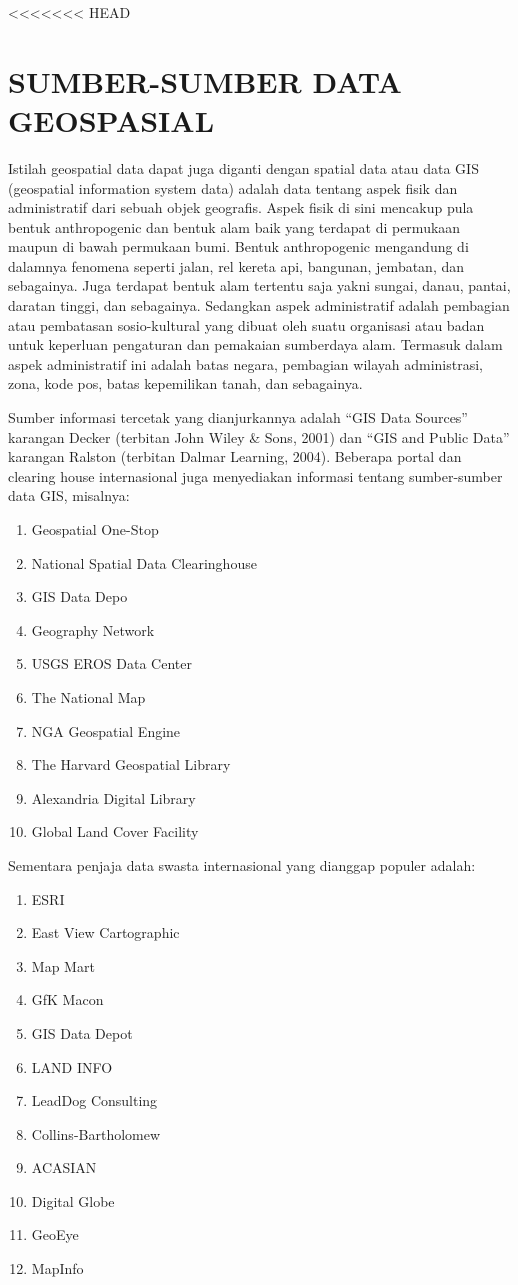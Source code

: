 <<<<<<< HEAD
\section{SUMBER-SUMBER DATA GEOSPASIAL}

Istilah geospatial data dapat juga diganti dengan spatial data atau data GIS (geospatial information system data) adalah data tentang aspek fisik dan administratif dari sebuah objek geografis. Aspek fisik di sini mencakup pula bentuk anthropogenic dan bentuk alam baik yang terdapat di permukaan maupun di bawah permukaan bumi. Bentuk anthropogenic mengandung di dalamnya fenomena seperti jalan, rel kereta api, bangunan, jembatan, dan sebagainya. Juga terdapat bentuk alam tertentu saja yakni sungai, danau, pantai, daratan tinggi, dan sebagainya. Sedangkan aspek administratif adalah pembagian atau pembatasan sosio-kultural yang dibuat oleh suatu organisasi atau badan untuk keperluan pengaturan dan pemakaian sumberdaya alam. Termasuk dalam aspek administratif ini adalah batas negara, pembagian wilayah administrasi, zona, kode pos, batas kepemilikan tanah, dan sebagainya. 

Sumber informasi tercetak yang dianjurkannya adalah “GIS Data Sources” karangan Decker (terbitan John Wiley \& Sons, 2001) dan “GIS and Public Data” karangan Ralston (terbitan Dalmar Learning, 2004). Beberapa portal dan clearing house internasional juga menyediakan informasi tentang sumber-sumber data GIS, misalnya:
\begin{enumerate}
\item Geospatial One-Stop
\item National Spatial Data Clearinghouse
\item GIS Data Depo
\item Geography Network
\item USGS EROS Data Center
\item The National Map
\item NGA Geospatial Engine
\item The Harvard Geospatial Library
\item Alexandria Digital Library
\item Global Land Cover Facility
\end{enumerate}

Sementara penjaja data swasta internasional yang dianggap populer adalah:
\begin{enumerate}
\item ESRI
\item East View Cartographic
\item Map Mart
\item GfK Macon
\item GIS Data Depot
\item LAND INFO
\item LeadDog Consulting
\item Collins-Bartholomew
\item ACASIAN
\item Digital Globe
\item GeoEye
\item MapInfo
\end{enumerate}

